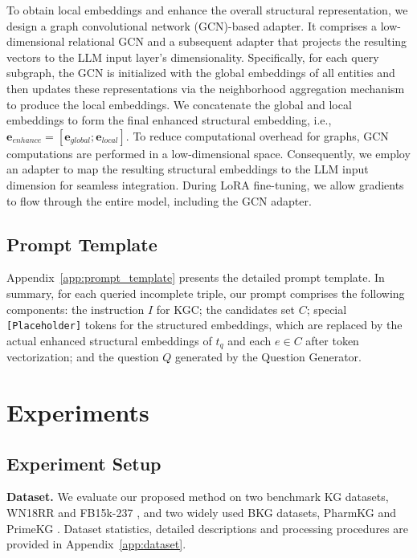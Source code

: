 \documentclass[11pt]{article}
\begin{document}
To obtain local embeddings and enhance the overall structural representation, we design a graph convolutional network (GCN)-based adapter. It comprises a low-dimensional relational GCN and a subsequent adapter that projects the resulting vectors to the LLM input layer’s dimensionality. Specifically, for each query subgraph, the GCN is initialized with the global embeddings of all entities and then updates these representations via the neighborhood aggregation mechanism to produce the local embeddings. We concatenate the global and local embeddings to form the final enhanced structural embedding, i.e., $\mathbf{e}_{enhance} = [\mathbf{e}_{global};\mathbf{e}_{local}]$. To reduce computational overhead for graphs, GCN computations are performed in a low-dimensional space. Consequently, we employ an adapter to map the resulting structural embeddings to the LLM input dimension for seamless integration. During LoRA fine-tuning, we allow gradients to flow through the entire model, including the GCN adapter.

\subsection{Prompt Template}
Appendix~\ref{app:prompt_template} presents the detailed prompt template. In summary,  for each queried incomplete triple, our prompt comprises the following components: the instruction $I$ for KGC; the candidates set $C$; special \texttt{[Placeholder]} tokens for the structured embeddings, which are replaced by the actual enhanced structural embeddings of $t_q$ and each $e \in C$ after token vectorization; and the question $Q$ generated by the Question Generator.

\section{Experiments}
\subsection{Experiment Setup}
\textbf{Dataset.} 
We evaluate our proposed method on two benchmark KG datasets, WN18RR \citep{dettmers2018convolutional} and FB15k-237 \citep{toutanova2015representing}, and two widely used BKG datasets, PharmKG \citep{zheng2021pharmkg} and PrimeKG \citep{chandak2023building}. Dataset statistics, detailed descriptions and processing procedures are provided in Appendix~\ref{app:dataset}. 

\end{document}
